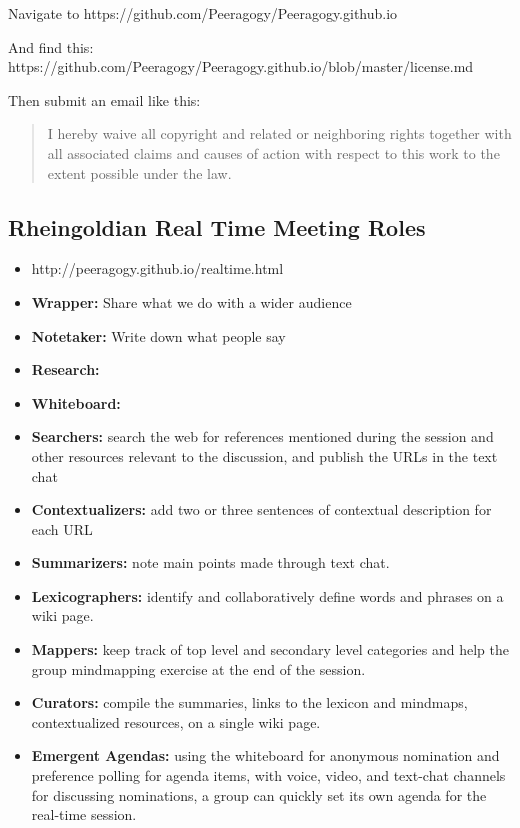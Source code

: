 Navigate to https://github.com/Peeragogy/Peeragogy.github.io

And find this:
https://github.com/Peeragogy/Peeragogy.github.io/blob/master/license.md

Then submit an email like this:

\begin{quote}
I hereby waive all copyright and related or neighboring rights together
with all associated claims and causes of action with respect to this
work to the extent possible under the law.
\end{quote}

\hypertarget{rheingoldian-real-time-meeting-roles}{%
\subsection{Rheingoldian Real Time Meeting
Roles}\label{rheingoldian-real-time-meeting-roles}}

\begin{itemize}
\item
  http://peeragogy.github.io/realtime.html
\item
  \textbf{Wrapper:} Share what we do with a wider audience
\item
  \textbf{Notetaker:} Write down what people say
\item
  \textbf{Research:}
\item
  \textbf{Whiteboard:}
\item
  \textbf{Searchers:} search the web for references mentioned during the
  session and other resources relevant to the discussion, and publish
  the URLs in the text chat
\item
  \textbf{Contextualizers:} add two or three sentences of contextual
  description for each URL
\item
  \textbf{Summarizers:} note main points made through text chat.
\item
  \textbf{Lexicographers:} identify and collaboratively define words and
  phrases on a wiki page.
\item
  \textbf{Mappers:} keep track of top level and secondary level
  categories and help the group mindmapping exercise at the end of the
  session.
\item
  \textbf{Curators:} compile the summaries, links to the lexicon and
  mindmaps, contextualized resources, on a single wiki page.
\item
  \textbf{Emergent Agendas:} using the whiteboard for anonymous
  nomination and preference polling for agenda items, with voice, video,
  and text-chat channels for discussing nominations, a group can quickly
  set its own agenda for the real-time session.
\end{itemize}

